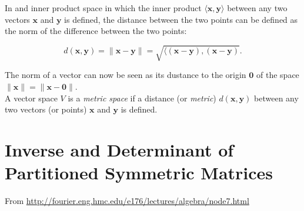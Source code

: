 \documentclass[10pt,b5paper,titlepage]{book}
\begin{document}
\begin{itemize}
\begin{itemize}
                 In and inner product space in which the inner product
                 $\langle \mathbf{x}, \mathbf{y} \rangle$ between any two vectors
                 $\mathbf{x}$ and $\mathbf{y}$ is defined, the distance between
                 the two points can be defined as the norm of the difference
                 between the two points:

                 \begin{equation}
                     d(\mathbf{x}, \mathbf{y}) = \|\mathbf{x} - \mathbf{y}\|
                     = \sqrt{\langle (\mathbf{x} - \mathbf{y}), (\mathbf{x} - \mathbf{y})}
                 .\end{equation}

                 The norm of a vector can now be seen as its dustance to the origin
                 $\mathbf{0}$ of the space $\|\mathbf{x}\| = \|\mathbf{x} - \mathbf{0}\|$.\\

                 A vector space $V$ is a \textit{metric space} if a distance
                 (or \textit{metric}) $d(\mathbf{x}, \mathbf{y})$ between any two
                 vectors (or points) $\mathbf{x}$ and $\mathbf{y}$ is defined.



         \end{itemize}



\end{itemize}







\chapter{Inverse and Determinant of Partitioned Symmetric Matrices}
From \url{http://fourier.eng.hmc.edu/e176/lectures/algebra/node7.html}\\
\end{document}

